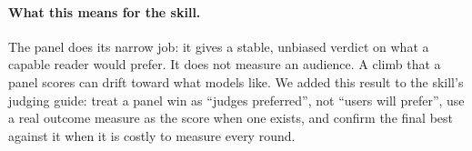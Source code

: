 \paragraph{What this means for the skill.} The panel does its narrow job: it gives a stable, unbiased verdict
on what a capable reader would prefer. It does not measure an audience. A climb that a panel scores can drift
toward what models like. We added this result to the skill's judging guide: treat a panel win as ``judges
preferred'', not ``users will prefer'', use a real outcome measure as the score when one exists, and confirm the
final best against it when it is costly to measure every round.
